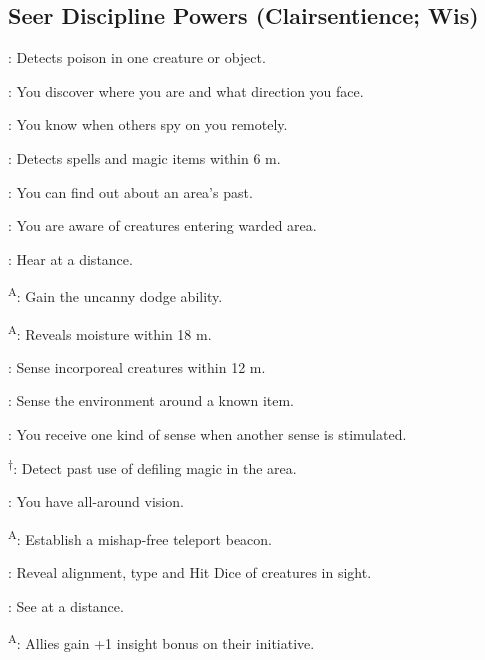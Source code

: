 \subsection{Seer Discipline Powers {\normalsize(Clairsentience; Wis)}}
\begin{enumerate*}
\item {}: Detects poison in one creature or object.

      : You discover where you are and what direction you face.

      : You know when others spy on you remotely.

\item {}: Detects spells and magic items within 6 m.

      : You can find out about an area's past.

      : You are aware of creatures entering warded area.

\item {}: Hear at a distance.

      \textsuperscript{A}: Gain the uncanny dodge ability.

      \textsuperscript{A}: Reveals moisture within 18 m.

      : Sense incorporeal creatures within 12 m.

      : Sense the environment around a known item.

      : You receive one kind of sense when another sense is stimulated.

      \textsuperscript{$\dagger$}: Detect past use of defiling magic in the area.

      : You have all-around vision.

\item {}\textsuperscript{A}: Establish a mishap-free teleport beacon.

      : Reveal alignment, type and Hit Dice of creatures in sight.

      : See at a distance.

      \textsuperscript{A}: Allies gain +1 insight bonus on their initiative.


\end{enumerate*}
